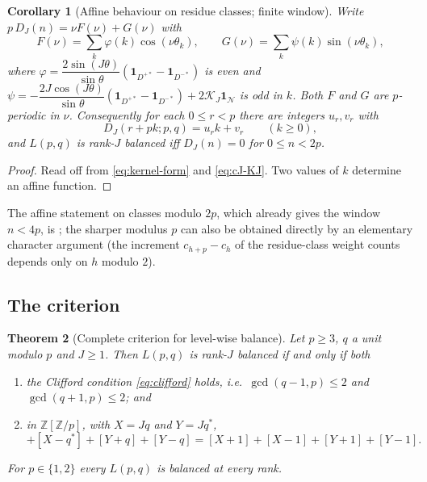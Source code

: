 \documentclass[11pt]{article}
\newtheorem{theorem}{Theorem}[section]
\newtheorem{corollary}[theorem]{Corollary}
\theoremstyle{definition}
\newcommand{\Z}{\mathbb Z}
\newcommand{\ind}{\mathbf 1}
\newcommand{\cK}{\mathcal K}
\begin{document}
\begin{corollary}[Affine behaviour on residue classes; finite window]
\label{cor:affine}
Write $p\,D_J(n)=\nu F(\nu)+G(\nu)$ with
\begin{equation}
 F(\nu)=\sum_{k}\varphi(k)\cos(\nu\theta_k),\qquad
 G(\nu)=\sum_{k}\psi(k)\sin(\nu\theta_k),
 \label{eq:FG}
\end{equation}
where $\varphi=\dfrac{2\sin(J\theta)}{\sin\theta}(\ind_{D^{+*}}-\ind_{D^{-*}})$
is even and
$\psi=-\dfrac{2J\cos(J\theta)}{\sin\theta}(\ind_{D^{+*}}-\ind_{D^{-*}})+2\cK_J\ind_{\mathcal N}$
is odd in $k$.  Both $F$ and $G$ are $p$-periodic in $\nu$.  Consequently
for each $0\leq r<p$ there are integers $u_r,v_r$ with
\begin{equation}
 D_J(r+pk;p,q)=u_rk+v_r\qquad(k\geq0),
 \label{eq:affine-mod-p}
\end{equation}
and $L(p,q)$ is rank-$J$ balanced iff $D_J(n)=0$ for $0\leq n<2p$.
\end{corollary}

\begin{proof}
Read off from \eqref{eq:kernel-form} and \eqref{eq:cJ-KJ}.  Two values of
$k$ determine an affine function.
\end{proof}

The affine statement on classes modulo $2p$, which already gives the
window $n<4p$, is \cite[Prop.~4.1]{MahmoodP1Collection2026}; the sharper
modulus $p$ can also be obtained directly by an elementary character
argument (the increment $c_{h+p}-c_h$ of the residue-class weight counts
depends only on $h$ modulo $2$).

\subsection{The criterion}

\begin{theorem}[Complete criterion for level-wise balance]
\label{thm:criterion}
Let $p\geq3$, $q$ a unit modulo $p$ and $J\geq1$.  Then $L(p,q)$ is
rank-$J$ balanced if and only if both
\begin{enumerate}[label=(\roman*)]
\item the Clifford condition \eqref{eq:clifford} holds, i.e.\
$\gcd(q-1,p)\leq2$ and $\gcd(q+1,p)\leq2$; and
\item in $\Z[\Z/p]$, with $X=Jq$ and $Y=Jq^*$,
\begin{equation}
 [X+q^*]+[X-q^*]+[Y+q]+[Y-q]=[X+1]+[X-1]+[Y+1]+[Y-1].
 \label{eq:odd-measure}
\end{equation}
\end{enumerate}
For $p\in\{1,2\}$ every $L(p,q)$ is balanced at every rank.
\end{theorem}
\end{document}
